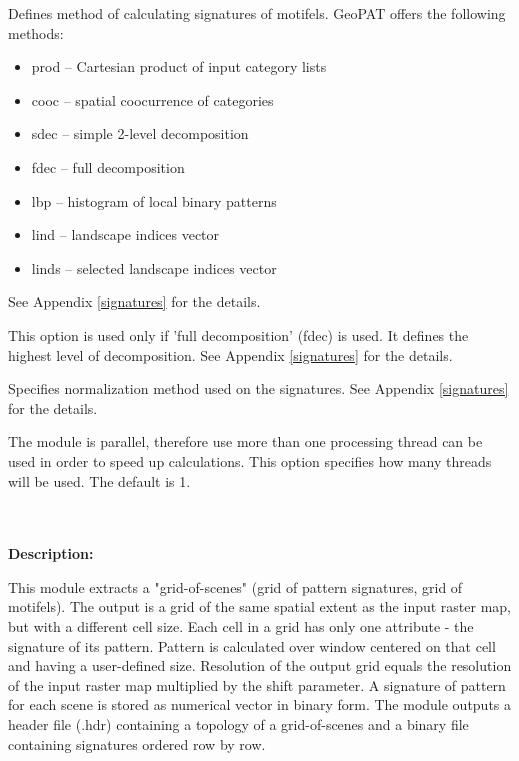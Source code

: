
Defines method of calculating signatures of motifels. GeoPAT offers the following methods: 
\begin{itemize}
	\item prod -- Cartesian product of input category lists
	\item cooc -- spatial coocurrence of categories
	\item sdec -- simple 2-level decomposition
	\item fdec -- full decomposition
	\item lbp -- histogram of local binary patterns
	\item lind -- landscape indices vector
	\item linds -- selected landscape indices vector
\end{itemize}
See Appendix \ref{signatures} for the details.


This option is used only if 'full decomposition' (fdec) is used.
It defines the highest level of decomposition. See Appendix \ref{signatures} for the details.


Specifies normalization method used on the signatures. See Appendix \ref{signatures} for the details.


The module is parallel, therefore use more than one processing thread can be used in order to speed up calculations. 
This option specifies how many threads will be used. 
The default is 1.

\\\\
{\bf Description:}

This module extracts a "grid-of-scenes" (grid of pattern signatures, grid of motifels). The output is a grid of the same spatial extent as the input raster map, but with a different cell size. Each cell in a grid has only one attribute - the signature of its pattern. Pattern is calculated over window centered on that cell and having a user-defined size. Resolution of the output grid equals the resolution of the input raster map multiplied by the shift parameter. A signature of pattern for each scene is stored as numerical vector in binary form. The module outputs a header file (.hdr) containing a topology of a grid-of-scenes and a binary file containing signatures ordered row by row.

